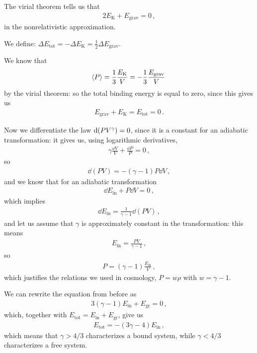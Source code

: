 \documentclass[main.tex]{subfiles}
\begin{document}
The virial theorem tells us that 
%
\begin{align}
  2 E _{\text{K}} + E _{\text{grav}} = 0
\,,
\end{align}
%
in the nonrelativistic approximation. 

We define: \(\Delta E _{\text{tot}} = - \Delta E _{\text{K}} = \frac{1}{2} \Delta E _{\text{grav}}\). 

We know that 
%
\begin{align}
  \expval{P} = \frac{1}{3} \frac{E _{\text{K}}}{V} = -\frac{1}{3} \frac{E _{\text{grav}}}{V}
\,
\end{align}
%
by the virial theorem: so the total binding energy is equal to zero, since this gives us 
%
\begin{align}
  E _{\text{grav}} + E _{\text{K}} = E _{\text{tot}} = 0
\,.
\end{align}
%

Now we differentiate the law \(\dd \qty(P V^{\gamma }) = 0\), since it is a constant for an adiabatic transformation: it gives us, using logarithmic derivatives, 
%
\begin{align}
  \gamma \frac{ \dd{V}}{V} + \frac{ \dd{P}}{P} = 0
\,,
\end{align}
%
so 
%
\begin{align}
  \dd{(PV)} = - (\gamma -1 ) P \dd{V}
\,,
\end{align}
%
and we know that for an adiabatic transformation 
%
\begin{align}
  \dd{E _{\text{in}}} + P \dd{V} = 0
\,,
\end{align}
%
which implies 
%
\begin{align}
  \dd{E _{\text{in}}} = \frac{1}{\gamma -1} \dd{(PV)}
\,,
\end{align}
%
and let us assume that \(\gamma \) is approximately constant in the transformation: this means 
%
\begin{align}
  E _{\text{in}} = \frac{PV}{\gamma -1}
\,,
\end{align}
%
so 
%
\begin{align}
  P = (\gamma -1 ) \frac{E _{\text{in}}}{V}
\,,
\end{align}
%
which justifies the relations we used in cosmology, \(P = w \rho \) with \(w = \gamma -1\). 

We can rewrite the equation from before as 
%
\begin{align}
  3(\gamma -1 ) E _{\text{in}} + E _{\text{gr}} = 0
\,,
\end{align}
%
which, together with \(E _{\text{tot}} = E _{\text{in}} + E _{\text{gr}}\), give us 
%
\begin{align}
  E _{\text{tot}} = - (3 \gamma - 4) E _{\text{in}}
\,,
\end{align}
%
which means that \(\gamma > 4/3\) characterizes a bound system, while \(\gamma < 4/3\) characterizes a free system. 
\end{document}
